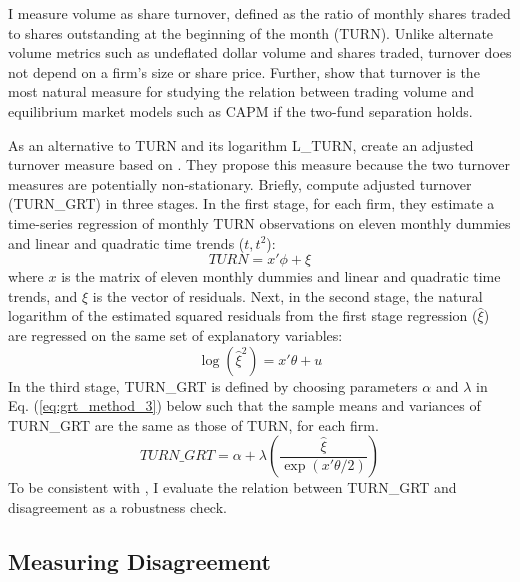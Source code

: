 \documentclass[
  12pt,
  a4paper,
  twoside,
  onecolumn]{article}
\begin{document}
I measure volume as share turnover, defined as the ratio of monthly
shares traded to shares outstanding at the beginning of the month
(TURN). Unlike alternate volume metrics such as undeflated dollar volume
and shares traded, turnover does not depend on a firm's size or share
price. Further, \cite{lo_wang2010} show that turnover is the most
natural measure for studying the relation between trading volume and
equilibrium market models such as CAPM if the two-fund separation holds.

As an alternative to TURN and its logarithm L\_TURN,
 create an adjusted turnover measure based
on \cite{grt1992}. They propose this measure because the two turnover
measures are potentially non-stationary. Briefly,
 compute adjusted turnover (TURN\_GRT) in
three stages. In the first stage, for each firm, they estimate a
time-series regression of monthly TURN observations on eleven monthly
dummies and linear and quadratic time trends (\(t, t^2\)):
\begin{equation}
\label{eq:grt_method_1}
TURN = x' \phi + \xi
\end{equation} where \(x\) is the matrix of eleven monthly dummies and
linear and quadratic time trends, and \(\xi\) is the vector of
residuals. Next, in the second stage, the natural logarithm of the
estimated squared residuals from the first stage regression
(\(\hat{\xi}\)) are regressed on the same set of explanatory variables:
\begin{equation}
\label{eq:grt_method_2}
\log(\hat{\xi}^2) = x' \theta + u
\end{equation} In the third stage, TURN\_GRT is defined by choosing
parameters \(\alpha\) and \(\lambda\) in Eq. (\ref{eq:grt_method_3})
below such that the sample means and variances of TURN\_GRT are the same
as those of TURN, for each firm. \begin{equation}
\label{eq:grt_method_3}
TURN\_GRT = \alpha + \lambda \left( \frac{\hat{\xi}}{\exp(x' \theta / 2)} \right)
\end{equation} To be consistent with , I
evaluate the relation between TURN\_GRT and disagreement as a robustness
check.

\hypertarget{measuring-disagreement}{%
\subsection{Measuring Disagreement}\label{measuring-disagreement}}
\end{document}

